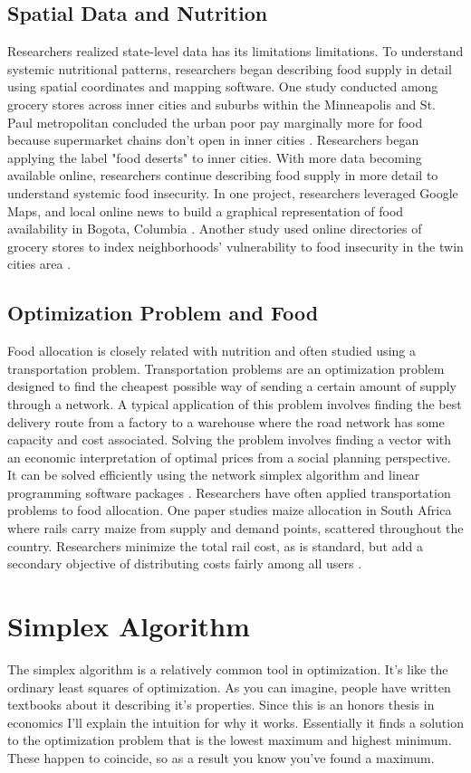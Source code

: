 \documentclass{report}
\begin{document}
\subsection{Spatial Data and Nutrition}
Researchers realized state-level data has its limitations limitations. To understand systemic nutritional patterns, researchers began describing food supply in detail using spatial coordinates and mapping software.  One study conducted among grocery stores across inner cities and suburbs within the Minneapolis and St. Paul metropolitan concluded the urban poor pay marginally more for food because supermarket chains don't open in inner cities \cite{Chung}. Researchers began applying the label "food deserts" to inner cities. With more data becoming available online, researchers continue describing food supply in more detail to understand systemic food insecurity. In one project, researchers leveraged Google Maps, and local online news to build a graphical representation of food availability in Bogota, Columbia \cite{Hwang}. Another study used online directories of grocery stores to index neighborhoods' vulnerability to food insecurity in the twin cities area \cite{Larson}.
 
\subsection{Optimization Problem and Food}
Food allocation is closely related with nutrition and often studied using a transportation problem. Transportation problems are an optimization problem designed to find the cheapest possible way of sending a certain amount of supply through a network. A typical application of this problem involves finding the best delivery route from a factory to a warehouse where the road network has some capacity and cost associated. Solving the problem involves finding a vector with an economic interpretation of optimal prices from a social planning perspective. It can be solved efficiently using the network simplex algorithm and linear programming software packages \cite{Cook}. Researchers have often applied transportation problems to food allocation. One paper studies maize allocation in South Africa where rails carry maize from supply and demand points, scattered throughout the country. Researchers minimize the total rail cost, as is standard, but add a secondary objective of distributing costs fairly among all users \cite{Stewart}.

\section{Simplex Algorithm}
The simplex algorithm is a relatively common tool in optimization. It's like the ordinary least squares of optimization. As you can imagine, people have written textbooks about it describing it's properties. Since this is an honors thesis in economics I'll explain the intuition for why it works. Essentially it finds a solution to the optimization problem that is the lowest maximum and highest minimum. These happen to coincide, so as a result you know you've found a maximum.
\end{document}
